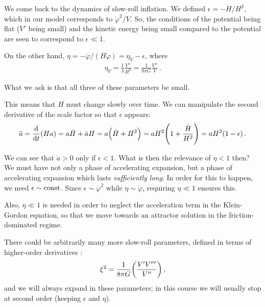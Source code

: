 \documentclass[main.tex]{subfiles}
\begin{document}

We come back to the dynamics of slow-roll inflation. 
We defined \(\epsilon = - \dot{H} / H^2 \), which in our model corresponds to \(\dot{\varphi}^2 / V \). 
So, the conditions of the potential being flat (\(V'\) being small) and the kinetic energy being small compared to the potential are seen to correspond to \(\epsilon \ll 1\). 

On the other hand, \(\eta = - \ddot{\varphi} / (H \dot{\varphi}) = \eta_V - \epsilon \), where 
%
\begin{align}
\eta _V = \frac{1}{3} \frac{V''}{H^2} = \frac{1}{8 \pi G} \frac{V''}{V}
\,.
\end{align}

What we ask is that all three of these parameters be small. 

This means that \(H\) must change slowly over time. 
We can manipulate the second derivative of the scale factor so that \(\epsilon \) appears:
%
\begin{align}
\ddot{a} = \dv{}{t} \qty(Ha) = a \dot{H} + \dot{a} H  = a \qty(\dot{H} + H^2) = a H^2 \qty(1 + \frac{\dot{H}}{H^2}) = a H^2 \qty(1 - \epsilon )
\,.
\end{align}

We can see that \(\ddot{a} > 0\) only if \(\epsilon < 1\). 
What is then the relevance of \(\eta < 1\) then? 
We must have not only a phase of accelerating expansion, but a phase of accelerating expansion which lasts \emph{sufficiently long}.
In order for this to happen, we need \(\epsilon \sim \text{const}\). Since \(\epsilon \sim \dot{\varphi}^2\) while \(\eta \sim \ddot{\varphi}\), requiring \(\eta \ll 1\) ensures this. 

Also, \(\eta \ll 1\) is needed in order to neglect the acceleration term in the Klein-Gordon equation, so that we move towards an attractor solution in the friction-dominated regime. 

There could be arbitrarily many more slow-roll parameters, defined in terms of higher-order derivatives \cite[pag.\ 406]{guzzettiGravitationalWavesInflation2016}: 
%
\begin{align}
\xi  ^2 = \frac{1}{8 \pi G} \qty(\frac{V' V'''}{V''})
\,,
\end{align}
%
and we will always expand in these parameters; in this course we will usually stop at second order (keeping \(\epsilon \) and \(\eta \)).
\end{document}
